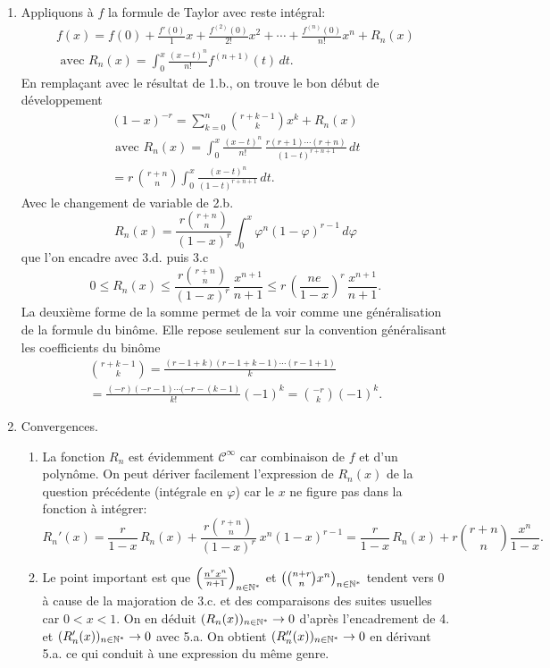 \begin{enumerate}
  \item Appliquons à $f$ la formule de Taylor avec reste intégral:
\begin{multline*}
  f(x) = f(0) + \frac{f'(0)}{1}x + \frac{f^{(2)}(0)}{2!}x^2 + \cdots + \frac{f^{(n)}(0)}{n!}x^n + R_n(x) \\
  \text{ avec }
  R_n(x) = 
  \int_0^x \frac{(x-t)^n}{n!}f^{(n+1)}(t)\,dt.
\end{multline*}
En remplaçant avec le résultat de 1.b., on trouve le bon début de développement
\begin{multline*}
  (1-x)^{-r} = \sum_{k=0}^{n}\binom{r+k-1}{k} x^k + R_n(x) \\\text{ avec }
  R_n(x) = \int_0^x \frac{(x-t)^n}{n!}\, \frac{r(r+1)\cdots(r+n)}{(1-t)^{r+n+1}}\,dt\\
  = r\,\binom{r+n}{n} \int_0^x  \frac{(x-t)^n}{(1-t)^{r+n+1}}\,dt.
\end{multline*}
Avec le changement de variable de 2.b.
\[
  R_n(x) = \frac{r\binom{r+n}{n}}{(1-x)^r} \int_0^x \varphi^n(1-\varphi)^{r-1}\,d\varphi
\]
que l'on encadre avec 3.d. puis 3.c
\[
  0\leq R_n(x) \leq \frac{r\binom{r+n}{n}}{(1-x)^r}\, \frac{x^{n+1}}{n+1}\leq r\,\left( \frac{ne}{1-x} \right)^r \,\frac{x^{n+1}}{n+1}.
\]
La deuxième forme de la somme permet de la voir comme une généralisation de la formule du binôme. Elle repose seulement sur la convention généralisant les coefficients du binôme
\begin{multline*}
  \binom{r+k-1}{k} = \frac{(r-1 + k)(r-1+k-1)\cdots(r-1 + 1)}{k}\\
  = \frac{(-r)(-r -1)\cdots (-r-(k-1)}{k!}(-1)^k 
  =\binom{-r}{k}(-1)^k .
\end{multline*}


  \item Convergences.
  \begin{enumerate}
    \item La fonction $R_n$ est évidemment $\mathcal{C}^{\infty}$ car combinaison de $f$ et d'un polynôme. On peut dériver facilement l'expression de $R_n(x)$ de la question précédente (intégrale en $\varphi$) car le $x$ ne figure pas dans la fonction à intégrer:
\[
  R_n'(x) = \frac{r}{1-x}\,R_n(x) + \frac{r\binom{r+n}{n}}{(1-x)^r}\ x^n(1-x)^{r-1}
  = \frac{r}{1-x}\,R_n(x) + r\binom{r+n}{n}\frac{x^n}{1-x}.
\]
    \item Le point important est que $\left(\frac{n^r x^n}{n+1}\right)_{n\in \mathbb{N}^*}$ et $\left(\binom{n+r}{n}x^n\right)_{n \in \mathbb{N}^*}$ tendent vers $0$ à cause de la majoration de 3.c. et des comparaisons des suites usuelles car $0<x<1$. On en déduit $(R_n(x))_{n \in \mathbb{N}^*}\rightarrow 0$ d'après l'encadrement de 4. et $(R'_n(x))_{n \in \mathbb{N}^*}\rightarrow 0$ avec 5.a. On obtient $(R''_n(x))_{n \in \mathbb{N}^*} \rightarrow 0$ en dérivant 5.a. ce qui conduit à une expression du même genre.
    

\end{enumerate}
\end{enumerate}
